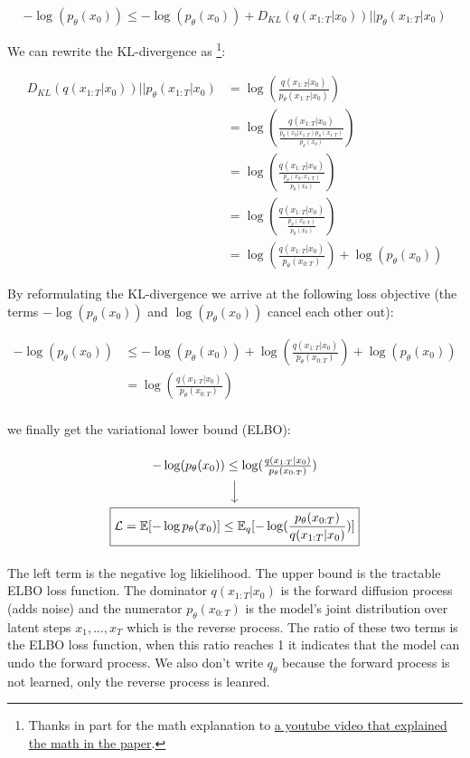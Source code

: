 \[
    -\log (p_\theta(x_0)) \leq -\log (p_\theta(x_0)) + D_{KL} (q(x_{1:T} | x_0)) \vert \vert p_\theta(x_{1:T} | x_0)
\]

We can rewrite the KL-divergence as \footnote{Thanks in part for the math explanation to \href{https://www.youtube.com/watch?v=HoKDTa5jHvg}{a youtube video that explained the math in the paper}.}:

\begin{align*}
    D_{KL} (q(x_{1:T} | x_0)) \vert \vert p_\theta(x_{1:T} | x_0) &= \log(\frac{q(x_{1:T} | x_0)}{p_\theta(x_{1:T} | x_0)}) \\
    &= \log(\frac{q(x_{1:T} | x_0)}{ \frac{p_\theta(x_0 | x_{1:T}) p_\theta(x_{1:T})}{p_\theta(x_0)} }) \\
    &= \log(\frac{q(x_{1:T} | x_0)}{ \frac{p_\theta(x_0, x_{1:T})}{p_\theta(x_0)} }) \\
    &= \log(\frac{q(x_{1:T} | x_0)}{ \frac{p_\theta(x_{0:T})}{p_\theta(x_0)} }) \\
    &= \log(\frac{q(x_{1:T} | x_0)}{ p_\theta(x_{0:T}) }) + \log(p_\theta(x_0))
\end{align*}

By reformulating the KL-divergence we arrive at the following loss objective (the terms $-\log(p_\theta(x_0))$ and $\log(p_\theta(x_0))$ cancel each other out):

\begin{align*}
    -\log (p_\theta(x_0)) &\leq -\log (p_\theta(x_0)) + \log (\frac{ q(x_{1:T} | x_0) }{ p_\theta (x_{0:T}) }) + \log(p_\theta(x_0)) \\
    &= \log (\frac{ q(x_{1:T} | x_0) }{ p_\theta (x_{0:T}) }) \\
\end{align*}

we finally get the variational lower bound (ELBO):

\[
\begin{tikzcd}
    -\log(p_\theta(x_0)) \leq \log(\frac{q(x_{1:T} | x_0)}{p_\theta(x_{0:T})})
    \arrow[d, ""] \\
    \boxed{\mathcal{L} = \mathbb{E}[-\log p_\theta (x_0)] \leq \mathbb{E}_q[-\log (\frac{p_\theta(x_{0:T})}{q(x_{1:T}|x_0)})]}
\end{tikzcd}
\]

The left term is the negative log likielihood. The upper bound is the tractable ELBO loss function. The dominator $q(x_{1:T}|x_0)$ is the forward diffusion process (adds noise) and the numerator $p_\theta(x_{0:T})$ is the model's joint distribution over latent steps $x_1, ..., x_T$ which is the reverse process. The ratio of these two terms is the ELBO loss function, when this ratio reaches 1 it indicates that the model can undo the forward process. We also don't write $q_\theta$ because the forward process is not learned, only the reverse process is leanred.

